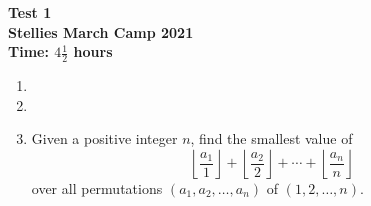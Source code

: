 \documentclass{article}
\begin{document}
\thispagestyle{empty}

\begin{center}
  \textbf{\Large Test 1}
  \\ \vspace{1em}
  \textbf{\large Stellies March Camp 2021}
  \\ \vspace{1em}
  \textbf{\large Time: $4\frac{1}{2}$ hours}
\end{center}

\vspace{24pt}

\begin{enumerate}

\item %


\item %


\item %
\newcommand{\floorf}[2]{\left\lfloor\frac{#1}{#2}\right\rfloor}
Given a positive integer $n$, find the smallest value of
\[ \floorf{a_1}{1} +\floorf{a_2}{2} +\dotsb +\floorf{a_n}{n} \]
over all permutations $(a_1, a_2, \dotsc, a_n)$ of $(1, 2, \dotsc, n)$.

\end{enumerate}

\vfill
\centering
\begin{BVerbatim}
\end{BVerbatim}
\end{document}
